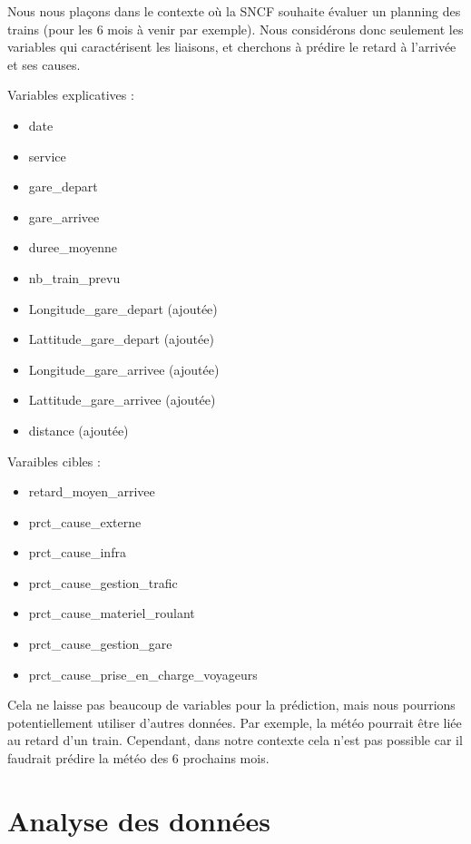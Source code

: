 \documentclass{article}
\begin{document}
Nous nous plaçons dans le contexte où la SNCF souhaite évaluer un planning des trains (pour les 6 mois à venir par exemple). Nous considérons donc seulement les variables qui caractérisent les liaisons, et cherchons à prédire le retard à l'arrivée et ses causes.
\begin{multicols}{2}
Variables explicatives :
\begin{itemize}[label=\textbullet, itemsep=0pt, parsep=0pt]
    \item date
    \item service
    \item gare\_depart
    \item gare\_arrivee
    \item duree\_moyenne
    \item nb\_train\_prevu
    \item Longitude\_gare\_depart (ajoutée)
    \item Lattitude\_gare\_depart (ajoutée)
    \item Longitude\_gare\_arrivee (ajoutée)
    \item Lattitude\_gare\_arrivee (ajoutée)
    \item distance (ajoutée)
\end{itemize}
\columnbreak
Varaibles cibles :
\begin{itemize}[label=\textbullet, itemsep=0pt, parsep=0pt]
    \item retard\_moyen\_arrivee
    \item prct\_cause\_externe
    \item prct\_cause\_infra
    \item prct\_cause\_gestion\_trafic
    \item prct\_cause\_materiel\_roulant
    \item prct\_cause\_gestion\_gare
    \item prct\_cause\_prise\_en\_charge\_voyageurs
\end{itemize}
\end{multicols}


\bigskip
Cela ne laisse pas beaucoup de variables pour la prédiction, mais nous pourrions potentiellement utiliser d'autres données. Par exemple, la météo pourrait être liée au retard d'un train. Cependant, dans notre contexte cela n'est pas possible car il faudrait prédire la météo des 6 prochains mois.

\section{Analyse des données}
\end{document}
